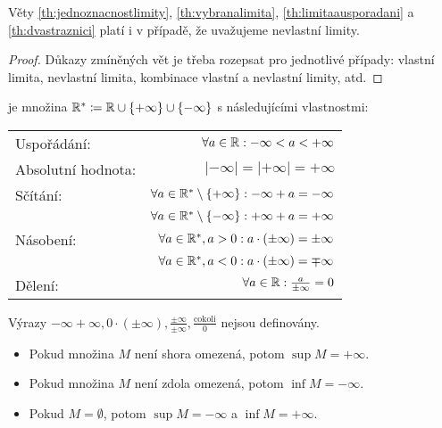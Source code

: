 \begin{metaproposition}
    Věty \ref{th:jednoznacnostlimity}, \ref{th:vybranalimita}, 
    \ref{th:limitaausporadani} a \ref{th:dvastraznici} platí i v případě,
    že uvažujeme nevlastní limity.
\end{metaproposition}

\begin{proof}
    Důkazy zmíněných vět je třeba rozepsat pro jednotlivé případy: 
    vlastní limita, nevlastní limita, kombinace vlastní a nevlastní 
    limity, atd. 
\end{proof}

\begin{definition}
     je množina $\mathbb{R}^* \coloneqq \mathbb{R} \cup 
    \left\{+\infty\right\}\cup \left\{-\infty\right\}$ s následujícími vlastnostmi:

    \begin{center}
        \begin{tabular}{lr}
            Uspořádání: &$\forall a \in \mathbb{R}: -\infty < a < +\infty$ \\
            Absolutní hodnota: &$|-\infty| = |+\infty| = +\infty$ \\
            Sčítání: &$\forall a \in \mathbb{R}^* \setminus \{+\infty\}: -\infty + a = -\infty$ \\
                     &$\forall a \in \mathbb{R}^* \setminus \{-\infty\}: +\infty + a = +\infty$ \\
            Násobení: &$\forall a \in \mathbb{R}^*, a>0: a\cdot (\pm\infty) = \pm \infty$ \\
                      &$\forall a \in \mathbb{R}^*, a<0: a\cdot (\pm\infty) = \mp \infty$ \\
            Dělení: &$\forall a \in \mathbb{R}: \frac{a}{\pm\infty} = 0$ \\
        \end{tabular}
    \end{center}

    Výrazy $-\infty + \infty, 0 \cdot (\pm\infty), \frac{\pm\infty}{\pm\infty},
    \frac{\text{cokoli}}{0}$ nejsou definovány.
\end{definition}
\begin{definition}
    \leavevmode
    \begin{itemize}
        \item Pokud množina $M$ není shora omezená, potom $\sup M = +\infty.$
        \item Pokud množina $M$ není zdola omezená, potom $\inf M = -\infty.$
        \item Pokud $M = \emptyset$, potom $\sup M = -\infty$ a 
            $\inf M = +\infty.$
    \end{itemize}
\end{definition}

